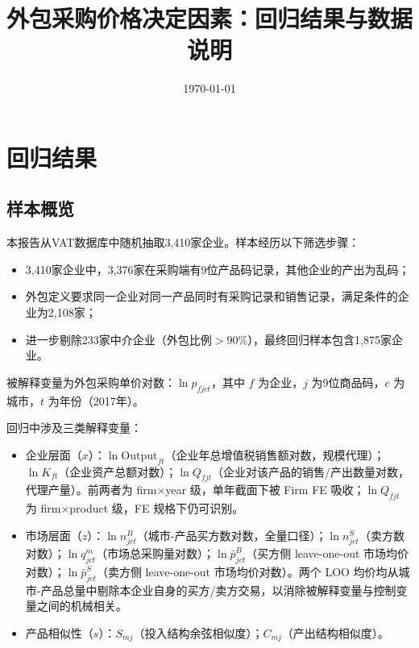 \documentclass[12pt]{article}
\begin{document}
\title{\textbf{外包采购价格决定因素：回归结果与数据说明}}
\author{}
\date{\today}
\maketitle



\section{回归结果}

\subsection*{样本概览}

本报告从VAT数据库中随机抽取3,410家企业。样本经历以下筛选步骤：

\begin{itemize}[nosep]
  \item 3,410家企业中，3,376家在采购端有9位产品码记录，其他企业的产出为乱码；
  \item 外包定义要求同一企业对同一产品同时有采购记录和销售记录，满足条件的企业为2,108家；
  \item 进一步剔除233家中介企业（外包比例$>90\%$），最终回归样本包含1,875家企业。
\end{itemize}

被解释变量为外包采购单价对数：$\ln p_{fjct}$，其中 $f$ 为企业，$j$ 为9位商品码，$c$ 为城市，$t$ 为年份（2017年）。

回归中涉及三类解释变量：
\begin{itemize}[nosep]
  \item 企业层面（$x$）：$\ln\mathrm{Output}_{ft}$（企业年总增值税销售额对数，规模代理）；$\ln K_{ft}$（企业资产总额对数）；$\ln Q_{fjt}$（企业对该产品的销售/产出数量对数，代理产量）。前两者为 firm$\times$year 级，单年截面下被 Firm FE 吸收；$\ln Q_{fjt}$ 为 firm$\times$product 级，FE 规格下仍可识别。
  \item 市场层面（$z$）：$\ln n^B_{jct}$（城市-产品买方数对数，全量口径）；$\ln n^S_{jct}$（卖方数对数）；$\ln q^m_{jct}$（市场总采购量对数）；$\ln\bar{p}^{B}_{jct}$（买方侧 leave-one-out 市场均价对数）；$\ln\bar{p}^{S}_{jct}$（卖方侧 leave-one-out 市场均价对数）。两个 LOO 均价均从城市-产品总量中剔除本企业自身的买方/卖方交易，以消除被解释变量与控制变量之间的机械相关。
  \item 产品相似性（$s$）：$S_{mj}$（投入结构余弦相似度）；$C_{mj}$（产出结构相似度）。
\end{itemize}
\end{document}
